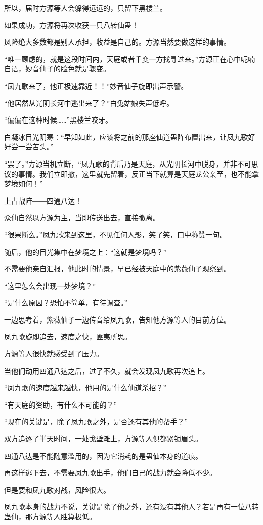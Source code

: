 \begin{this_body}
所以，届时方源等人会躲得远远的，只留下黑楼兰。

如果成功，方源将再次收获一只八转仙蛊！

风险绝大多数都是别人承担，收益是自己的。方源当然要做这样的事情。

“唯一顾虑的，就是这段时间内，天庭或者千变一方找寻过来。”方源正在心中呢喃自语，妙音仙子的脸色就是骤变。

“凤九歌来了，他正极速靠近！！”妙音仙子旋即出声示警。

“他居然从光阴长河中逃出来了？”白兔姑娘失声低呼。

“偏偏在这种时候……”黑楼兰咬牙。

白凝冰目光阴寒：“早知如此，应该将之前的那座仙道蛊阵布置出来，让凤九歌好好尝一尝苦头。”

“罢了。”方源当机立断，“凤九歌的背后乃是天庭，从光阴长河中脱身，并非不可思议的事情。我们立即撤，这里就先留着，反正当下就算是天庭龙公亲至，也不能拿梦境如何！”

上古战阵――四通八达！

众仙自然以方源为主，当即传送出去，直接撤离。

“很果断么。”凤九歌来到这里，不见任何人影，笑了笑，口中称赞一句。

随后，他的目光集中在梦境之上：“这就是梦境吗？”

不需要他亲自汇报，他此时的情景，早已经被天庭中的紫薇仙子观察到。

“这里怎么会出现一处梦境？”

“是什么原因？恐怕不简单，有待调查。”

一边思考着，紫薇仙子一边传音给凤九歌，告知他方源等人的目前方位。

凤九歌旋即追去，速度之快，匪夷所思。

方源等人很快就感受到了压力。

当他们动用四通八达之后，过了不久，就会发现凤九歌再次追上。

“凤九歌的速度越来越快，他用的是什么仙道杀招？”

“有天庭的资助，有什么不可能的？”

“现在的关键是，除了凤九歌之外，是否还有其他的帮手？”

双方追逐了半天时间，一处戈壁滩上，方源等人俱都紧锁眉头。

四通八达是不能随意滥用的，因为它消耗的是蛊仙本身的道痕。

再这样逃下去，不需要凤九歌出手，他们自己的战力就会降低不少。

但是要和凤九歌对战，风险很大。

凤九歌本身的战力不说，关键是除了他之外，还有没有其他人？若是再有一位八转蛊仙，那方源等人胜算极低。


\end{this_body}
